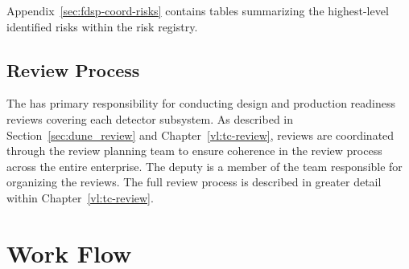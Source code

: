 Appendix~\ref{sec:fdsp-coord-risks} contains tables summarizing the 
highest-level identified risks within the  risk registry.

\subsection{Review Process}

The  has primary responsibility for conducting design 
and production readiness reviews covering each detector subsystem.  As 
described in Section~\ref{sec:dune_review} and Chapter~\ref{vl:tc-review}, 
reviews are coordinated through the  review planning team to 
ensure coherence in the review process across the entire  
enterprise.  The deputy  is a member of the  
team responsible for organizing the reviews.  The full review process is 
described in greater detail within Chapter~\ref{vl:tc-review}.

\section{ Work Flow}
\label{sec:workflow}

